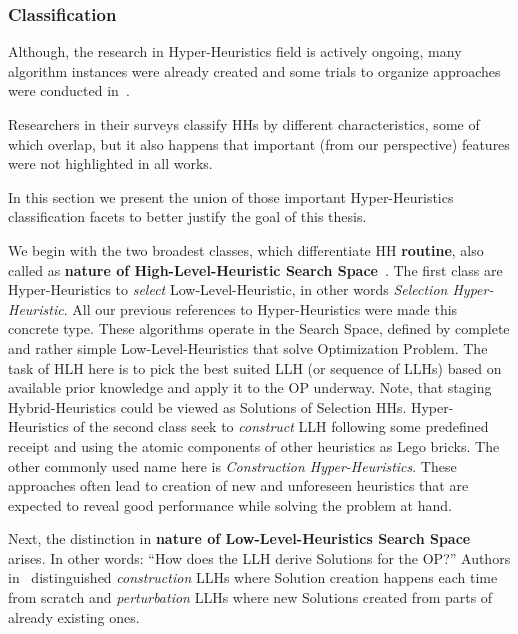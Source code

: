 \subsubsection{Classification}
Although, the research in Hyper-Heuristics field is actively ongoing, many algorithm instances were already created and some trials to organize approaches were conducted in~\cite{ryser2014review,drake2019recent,burke2019classification}.

Researchers in their surveys classify HHs by different characteristics, some of which overlap, but it also happens that important (from our perspective) features were not highlighted in all works. 

In this section we present the union of those important Hyper-Heuristics classification facets to better justify the goal of this thesis.

We begin with the two broadest classes, which differentiate HH \textbf{routine}, also called as \textbf{nature of High-Level-Heuristic Search Space}~\cite{burke2013hyper,burke2019classification,drake2019recent}.
The first class are Hyper-Heuristics to \textit{select} Low-Level-Heuristic, in other words \textit{Selection Hyper-Heuristic}. All our previous references to Hyper-Heuristics were made this concrete type. These algorithms operate in the Search Space, defined by complete and rather simple Low-Level-Heuristics that solve Optimization Problem. The task of HLH here is to pick the best suited LLH (or sequence of LLHs) based on available prior knowledge and apply it to the OP underway. Note, that staging Hybrid-Heuristics could be viewed as Solutions of Selection HHs.
Hyper-Heuristics of the second class seek to \textit{construct} LLH following some predefined receipt and using the atomic components of other heuristics as Lego bricks. The other commonly used name here is \textit{Construction Hyper-Heuristics}. These approaches often lead to creation of new and unforeseen heuristics that are expected to reveal good performance while solving the problem at hand.

Next, the distinction in \textbf{nature of Low-Level-Heuristics Search Space} arises. 
In other words: ``How does the LLH derive Solutions for the OP?'' Authors in~\cite{burke2013hyper,burke2019classification,drake2019recent} distinguished \textit{construction} LLHs where Solution creation happens each time from scratch and \textit{perturbation} LLHs where new Solutions created from parts of already existing ones.

